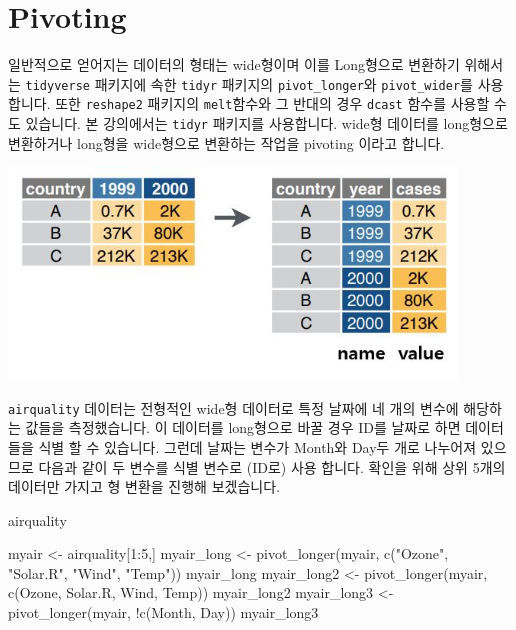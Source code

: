 \documentclass[
]{book}
\newenvironment{Shaded}{\begin{snugshade}}{\end{snugshade}}
\newcommand{\DecValTok}[1]{\textcolor[rgb]{0.00,0.00,0.81}{#1}}
\newcommand{\FunctionTok}[1]{\textcolor[rgb]{0.00,0.00,0.00}{#1}}
\newcommand{\NormalTok}[1]{#1}
\newcommand{\OtherTok}[1]{\textcolor[rgb]{0.56,0.35,0.01}{#1}}
\newcommand{\SpecialCharTok}[1]{\textcolor[rgb]{0.00,0.00,0.00}{#1}}
\newcommand{\StringTok}[1]{\textcolor[rgb]{0.31,0.60,0.02}{#1}}
\begin{document}
\hypertarget{pivoting}{%
\section{Pivoting}\label{pivoting}}

일반적으로 얻어지는 데이터의 형태는 wide형이며 이를 Long형으로 변환하기 위해서는 \texttt{tidyverse} 패키지에 속한 \texttt{tidyr} 패키지의 \texttt{pivot\_longer}와 \texttt{pivot\_wider}를 사용합니다. 또한 \texttt{reshape2} 패키지의 \texttt{melt}함수와 그 반대의 경우 \texttt{dcast} 함수를 사용할 수도 있습니다. 본 강의에서는 \texttt{tidyr} 패키지를 사용합니다. wide형 데이터를 long형으로 변환하거나 long형을 wide형으로 변환하는 작업을 pivoting 이라고 합니다.

\includegraphics[width=4.6875in,height=\textheight]{images/07/wide2long.JPG}

\texttt{airquality} 데이터는 전형적인 wide형 데이터로 특정 날짜에 네 개의 변수에 해당하는 값들을 측정했습니다. 이 데이터를 long형으로 바꿀 경우 ID를 날짜로 하면 데이터들을 식별 할 수 있습니다. 그런데 날짜는 변수가 Month와 Day두 개로 나누어져 있으므로 다음과 같이 두 변수를 식별 변수로 (ID로) 사용 합니다. 확인을 위해 상위 5개의 데이터만 가지고 형 변환을 진행해 보겠습니다.

\begin{Shaded}
\begin{Highlighting}[]
\NormalTok{airquality}

\NormalTok{myair }\OtherTok{\textless{}{-}}\NormalTok{ airquality[}\DecValTok{1}\SpecialCharTok{:}\DecValTok{5}\NormalTok{,]}
\NormalTok{myair\_long }\OtherTok{\textless{}{-}} \FunctionTok{pivot\_longer}\NormalTok{(myair, }\FunctionTok{c}\NormalTok{(}\StringTok{"Ozone"}\NormalTok{, }\StringTok{"Solar.R"}\NormalTok{, }\StringTok{"Wind"}\NormalTok{, }\StringTok{"Temp"}\NormalTok{))}
\NormalTok{myair\_long }
\NormalTok{myair\_long2 }\OtherTok{\textless{}{-}} \FunctionTok{pivot\_longer}\NormalTok{(myair, }\FunctionTok{c}\NormalTok{(Ozone, Solar.R, Wind, Temp))}
\NormalTok{myair\_long2 }
\NormalTok{myair\_long3 }\OtherTok{\textless{}{-}} \FunctionTok{pivot\_longer}\NormalTok{(myair, }\SpecialCharTok{!}\FunctionTok{c}\NormalTok{(Month, Day))}
\NormalTok{myair\_long3}
\end{Highlighting}
\end{Shaded}
\end{document}
